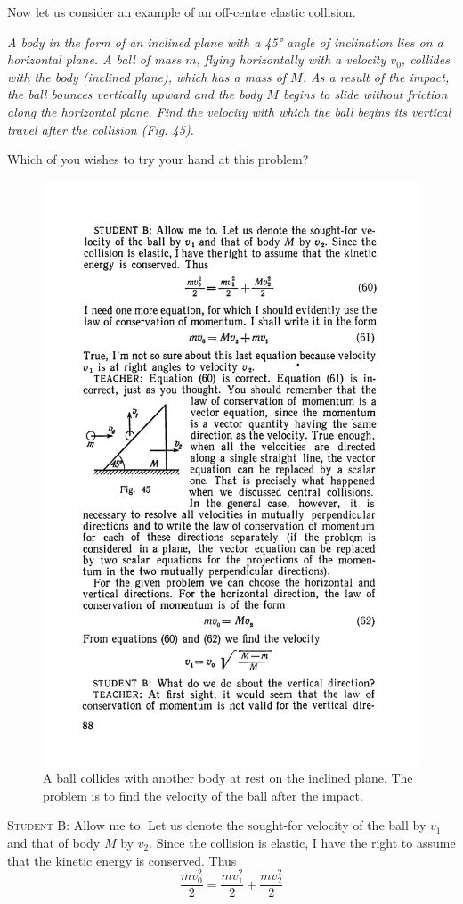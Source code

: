 \documentclass[a4paper,sfsidenotes]{tufte-book}
\begin{document}
Now let us consider an example of an off-centre elastic collision. 

\emph{A body in the form of an inclined plane with a \ang{45} angle of inclination lies on a horizontal plane. A ball of mass $m$, flying horizontally with a velocity $v_{0}$, collides with the body (inclined plane), which has a mass of $M$. As a result of the impact, the ball bounces vertically upward and the body $M$ begins to slide without friction along the horizontal plane. Find the velocity with which the ball begins its vertical travel after the collision (Fig. 45).}

Which of you wishes to try your hand at this problem?
\\

\begin{figure}
\centering
\includegraphics[width=0.4\linewidth]{fig-045a.pdf}
\caption{A ball collides with another body at rest on the inclined plane. The problem is to find the velocity of the ball after the impact.}
\label{fig-45}
\end{figure}

\textsc{Student B:} Allow me to. Let us denote the sought-for velocity of the ball by $v_{1}$ and that of body $M$ by $v_{2}$. Since the collision is elastic, I have the right to assume that the kinetic energy is conserved. Thus
\\
\begin{equation} 
\frac{mv_{0}^{2}}{2} = \frac{mv_{1}^{2}}{2} + \frac{mv_{2}^{2}}{2} 
\label{eq-60}
\end{equation}
\end{document}
